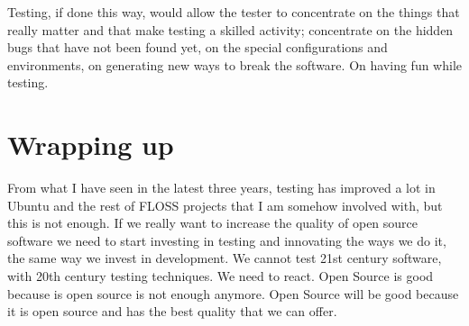 Testing, if done this way, would allow the tester to concentrate on the things that really matter and that make testing a skilled activity; concentrate on the hidden bugs that have not been found yet, on the special configurations and environments, on generating new ways to break the software. On having fun while testing.

\section*{Wrapping up}

From what I have seen in the latest three years, testing has improved a lot in Ubuntu and the rest of FLOSS projects that I am somehow involved with, but this is not enough. If we really want to increase the quality of open source software we need to start investing in testing and innovating the ways we do it, the same way we invest in development. We cannot test 21st century software, with 20th century testing techniques. We need to react. Open Source is good because is open source is not enough anymore. Open Source will be good because it is open source and has the best quality that we can offer.
